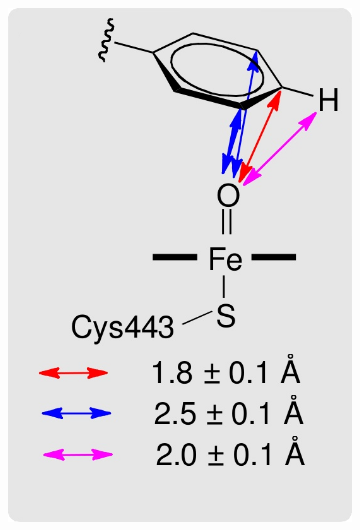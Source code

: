 \begin{figure}
    \centering
    \begin{subfigure}[b]{0.35\textwidth}
    \centering
    \includegraphics[width=1.0\textwidth]{figures/idsite/34b}
    \caption{}
    \label{figure:second_sp2_constraints}
    \end{subfigure}
    \hspace{0.1\textwidth}
    \begin{subfigure}[b]{0.35\textwidth}
    \centering

\end{subfigure}
\end{figure}
